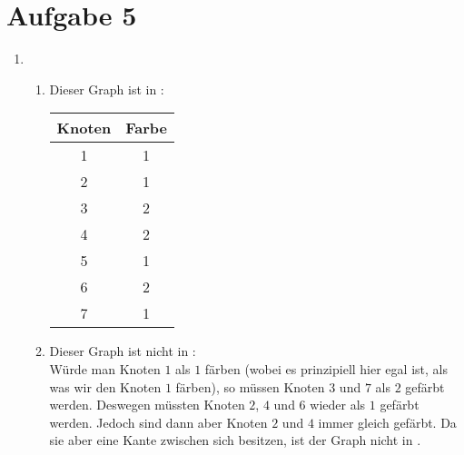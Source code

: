 \documentclass[a4paper,11pt]{scrartcl}
\begin{document}
	\section*{Aufgabe 5}
	\begin{enumerate}[label=\alph*)]
	\item	
		\begin{enumerate}[label=\arabic*)]
		\item	Dieser Graph ist in :\\
			\begin{tabular}{c|c}
			Knoten & Farbe\\
			\hline
			1 & 1\\
			2 & 1\\
			3 & 2\\
			4 & 2\\
			5 & 1\\
			6 & 2\\
			7 & 1\\
			\end{tabular}
		\item	Dieser Graph ist nicht in :\\
				Würde man Knoten $1$ als $1$ färben (wobei es prinzipiell hier egal ist, als was wir den Knoten $1$ färben), so müssen Knoten $3$ und $7$ als $2$ gefärbt werden. Deswegen müssten Knoten $2$, $4$ und $6$ wieder als $1$ gefärbt werden. Jedoch sind dann aber Knoten $2$ und $4$ immer gleich gefärbt. Da sie aber eine Kante zwischen sich besitzen, ist der Graph nicht in .
		\end{enumerate}
		

\end{enumerate}
\end{document}

